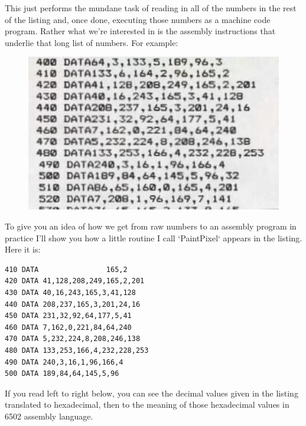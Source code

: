 This just performs the mundane task of reading in all of the numbers in the
rest of the listing and, once done, executing those numbers as a machine code
program. Rather what we're interested in is the assembly instructions that
underlie that long list of numbers. For example:

\begin{figure}[H]
    \centering
    \begin{adjustbox}{width=12cm,center}
      \includegraphics[width=12cm]{src/listing/PaintPixel.jpg}%
    \end{adjustbox}
\end{figure}

To give you an idea of how we get from raw numbers to an assembly program in practice I'll show you how
a little routine I call `PaintPixel` appears in the listing. Here it is:

\begin{lstlisting}
410 DATA                165,2
420 DATA 41,128,208,249,165,2,201
430 DATA 40,16,243,165,3,41,128
440 DATA 208,237,165,3,201,24,16
450 DATA 231,32,92,64,177,5,41
460 DATA 7,162,0,221,84,64,240
470 DATA 5,232,224,8,208,246,138
480 DATA 133,253,166,4,232,228,253
490 DATA 240,3,16,1,96,166,4
500 DATA 189,84,64,145,5,96   
\end{lstlisting}

If you read left to right below, you can see the decimal values given in the listing translated to
hexadecimal, then to the meaning of those hexadecimal values in 6502 assembly language.

